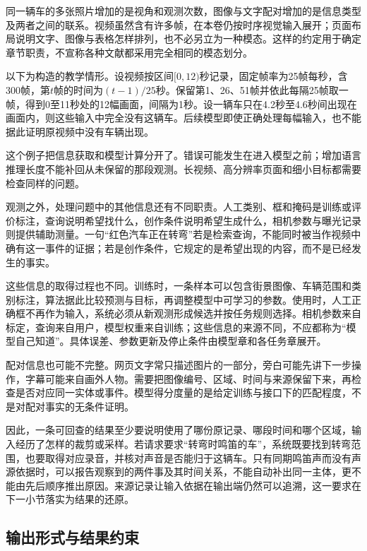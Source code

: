 同一辆车的多张照片增加的是视角和观测次数，图像与文字配对增加的是信息类型及两者之间的联系。视频虽然含有许多帧，在本卷仍按时序视觉输入展开；页面布局说明文字、图像与表格怎样排列，也不必另立为一种模态。这样的约定用于确定章节职责，不宣称各种文献都采用完全相同的模态划分。

\begin{example}[采样之后还能看见什么]
  \label{ex:vision-overview-sampling}
  以下为构造的教学情形。设视频按区间$[0,12)$秒记录，固定帧率为25帧每秒，含300帧，第$t$帧的时间为$(t-1)/25$秒。保留第1、26、51帧并依此每隔25帧取一帧，得到0至11秒处的12幅画面，间隔为1秒。设一辆车只在4.2秒至4.6秒间出现在画面内，则这些输入中完全没有这辆车。后续模型即使正确处理每幅输入，也不能据此证明原视频中没有车辆出现。
\end{example}

这个例子把信息获取和模型计算分开了。错误可能发生在进入模型之前；增加语言推理长度不能补回从未保留的那段观测。长视频、高分辨率页面和细小目标都需要检查同样的问题。

观测之外，处理问题中的其他信息还有不同职责。人工类别、框和掩码是训练或评价标注，查询说明希望找什么，创作条件说明希望生成什么，相机参数与曝光记录则提供辅助测量。一句“红色汽车正在转弯”若是检索查询，不能同时被当作视频中确有这一事件的证据；若是创作条件，它规定的是希望出现的内容，而不是已经发生的事实。

这些信息的取得过程也不同。训练时，一条样本可以包含街景图像、车辆范围和类别标注，算法据此比较预测与目标，再调整模型中可学习的参数。使用时，人工正确框不再作为输入，系统必须从新观测形成候选并按任务规则选择。相机参数来自标定，查询来自用户，模型权重来自训练；这些信息的来源不同，不应都称为“模型自己知道”。具体误差、参数更新及停止条件由模型章和各任务章展开。

配对信息也可能不完整。网页文字常只描述图片的一部分，旁白可能先讲下一步操作，字幕可能来自画外人物。需要把图像编号、区域、时间与来源保留下来，再检查是否对应同一实体或事件。模型得分度量的是给定训练与接口下的匹配程度，不是对配对事实的无条件证明。

因此，一条可回查的结果至少要说明使用了哪份原记录、哪段时间和哪个区域，输入经历了怎样的裁剪或采样。若请求要求“转弯时鸣笛的车”，系统既要找到转弯范围，也要取得对应录音，并核对声音是否能归于这辆车。只有同期鸣笛声而没有声源依据时，可以报告观察到的两件事及其时间关系，不能自动补出同一主体，更不能由先后顺序推出原因。来源记录让输入依据在输出端仍然可以追溯，这一要求在下一小节落实为结果的还原。

\subsection{输出形式与结果约束}
\label{sec:vision-overview-outputs}
\label{sec:vision-overview-evidence}

